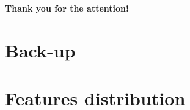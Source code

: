 \documentclass[xcolor=table,8pt]{beamer}
\begin{document}
  





    \begin{frame}

        {
        \begin{center}
            \begin{minipage}[c]{0.65\textwidth}
                \begin{tcolorbox}[colframe=beamer@blendedblue, colback=blueinnerbox]
                    \begin{center}
                        \Huge \alert{\textbf{Thank you for the attention!}}
                    \end{center}
                \end{tcolorbox}
            \end{minipage}
        \end{center}
        }
    \end{frame}
    
    


    \section{Back-up}
    \appendix
    \section{Features distribution}
\end{document}
